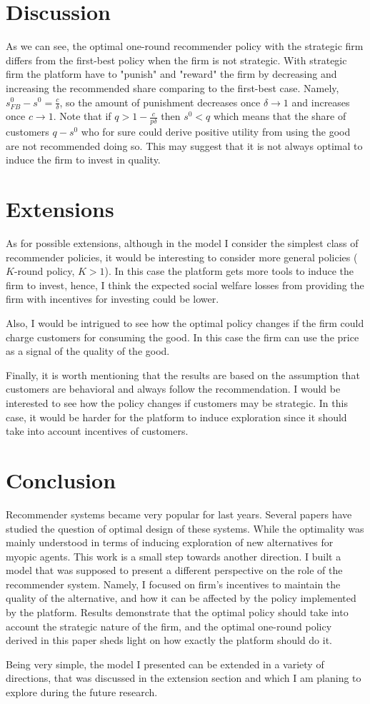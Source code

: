 \documentclass[a4paper]{article}
\begin{document}
\section{Discussion}
As we can see, the optimal one-round recommender policy with the strategic firm differs from the first-best policy when the firm is not strategic. With strategic firm the platform have to "punish" and "reward" the firm by decreasing and increasing the recommended share comparing to the first-best case. Namely, $s^0_{FB} - s^0 = \frac{c}{\delta}$, so the amount of punishment decreases once $\delta \to 1$ and increases once $c \to 1$. Note that if $q > 1 - \frac{c}{p\delta}$ then $s^0 < q$ which means that the share of customers $q - s^0$ who for sure could derive positive utility from using the good are not recommended doing so. This may suggest that it is not always optimal to induce the firm to invest in quality.





\section{Extensions}
As for possible extensions, although in the model I consider the simplest class of recommender policies, it would be interesting to consider more general policies ($K$-round policy, $K > 1$). In this case the platform gets more tools to induce the firm to invest, hence, I think the expected social welfare losses from providing the firm with incentives for investing could be lower.




Also, I would be intrigued to see how the optimal policy changes if the firm could charge customers for consuming the good. In this case the firm can use the price as a signal of the quality of the good. 




Finally, it is worth mentioning that the results are based on the assumption that customers are behavioral and always follow the recommendation. I would be interested to see how the policy changes if customers may be strategic. In this case, it would be harder for the platform to induce exploration since it should take into account incentives of customers. 
\section{Conclusion}
Recommender systems became very popular for last years. Several papers have studied the question of optimal design of these systems. While the optimality was mainly understood in terms of inducing exploration of new alternatives for myopic agents. This work is a small step towards another direction. I built a model that was supposed to present a different perspective on the role of the recommender system. Namely, I focused on firm's incentives to maintain the quality of the alternative, and how it can be affected by the policy implemented by the platform. Results demonstrate that the optimal policy should take into account the strategic nature of the firm, and the optimal one-round policy derived in this paper sheds light on how exactly the platform should do it. 


Being very simple, the model I presented can be extended in a variety of directions, that was discussed in the extension section and which I am planing to explore during the future research.


 
{}

\end{document}
